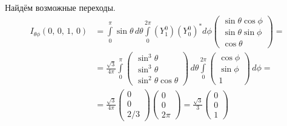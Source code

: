 Найдём возможные переходы.
\begin{align*}
    I_{\theta\phi}(0,\,0,\,1,\,0) &= \int\limits_{0}^{\pi}\sin\theta\,d\theta\int\limits_{0}^{2\pi}(Y^0_1)(Y^0_0)^* d\phi \begin{pmatrix} \sin\theta\cos\phi \\ \sin\theta\sin\phi \\ \cos\theta \end{pmatrix} = \\
    & = \frac{\sqrt{3}}{4\pi}\int\limits_{0}^{\pi} \begin{pmatrix} \sin^3\theta\\ \sin^3 \theta \\ \sin^2\theta\cos\theta \end{pmatrix} \, d\theta \int\limits_{0}^{2\pi} \begin{pmatrix} \cos\phi \\ \sin\phi \\ 1 \end{pmatrix} \, d\phi = \\
    & = \frac{\sqrt{3}}{4\pi}\begin{pmatrix} 0 \\  0 \\ 2/3 \end{pmatrix} \begin{pmatrix} 0 \\  0 \\ 2\pi \end{pmatrix} = \frac{\sqrt{3}}{3}\begin{pmatrix} 0 \\  0 \\ 1 \end{pmatrix}
\end{align*}
